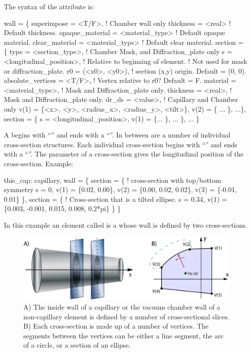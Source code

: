 The syntax of the  attribute is:
\begin{example}
  wall = \{
    superimpose = <T/F>,               ! Chamber wall only
    thickness = <real>                 ! Default thickness. 
    opaque_material = <material_type>  ! Default opaque material. 
    clear_material = <material_type>   ! Default clear material. 
    section = \{ 
      type = <section_type>,           ! Chamber Mask, and Diffraction_plate only
      s = <longitudinal_position>,     ! Relative to beginning of element.
                                       !   Not used for mask or diffraction_plate.
      r0 = (<x0>, <y0>),               ! section (x,y) origin. Default = (0, 0).
      absolute_vertices = <T/F>,       ! Vertex relative to r0? Default = F.
      material = <material_type>,      ! Mask and Diffraction_plate only.
      thickness = <real>,              ! Mask and Diffraction_plate only.
      dr_ds = <value>,                 ! Capillary and Chamber only
      v(1) = \{<x>, <y>, <radius_x>, <radius_y>, <tilt>\}, 
      v(2) = \{ ... \},
      ...\},
    section = \{
      s = <longitudinal_position>, 
      v(1) = \{... \},
      ... \},
    ... \}
\end{example}
A  begins with ``'' and ends with a ``\vn{\}}''. In between are a number of
individual cross-section structures. Each individual cross-section begins with ``''
and ends with a ``\vn{\}}''. The  parameter of a cross-section gives the longitudinal position
of the cross-section.  Example:
\begin{example}
  this_cap: capillary, 
    wall = \{   
      section = \{ ! cross-section with top/bottom symmetry
        s = 0, v(1) =  \{0.02, 0.00\}, 
        v(2) = \{0.00, 0.02, 0.02\}, v(3) = \{-0.01, 0.01\} \}, 
      section = \{  ! Cross-section that is a tilted ellipse.
        s = 0.34, 
        v(1) = \{0.003, -0.001, 0.015, 0.008, 0.2*pi\} \} \}
\end{example}
In this example an element called  is a 
whose wall is defined by two cross-sections.


\begin{figure}[tb]
  \centering
  \includegraphics[width=6in]{chamber-wall.pdf}
  \caption[Capillary or vacuum chamber wall.]
{A) The inside wall of a capillary or the vacuum chamber wall of a non-capillary element is defined
by a number of cross-sectional slices.  B) Each cross-section is made up of a number of
vertices. The segments between the vertices can be either a line segment, the arc of a circle, or a
section of an ellipse.}
  \label{f:chamber.wall}
\end{figure}

